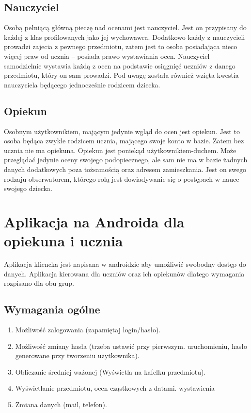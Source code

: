\documentclass[12pt, titlepage]{article}
\begin{document}
\subsection{Nauczyciel}

Osobą pełniącą główną pieczę nad ocenami jest nauczyciel. Jest on przypisany do każdej z klas profilowanych jako jej wychowawca. Dodatkowo każdy z nauczycieli prowadzi zajecia z pewnego przedmiotu, zatem jest to osoba posiadająca nieco więcej praw od ucznia – posiada prawo wystawiania ocen. Nauczyciel samodzielnie wystawia każdą z ocen na podstawie osiągnięć uczniów z danego przedmiotu, który on sam prowadzi. Pod uwagę została również wzięta kwestia nauczyciela będącego jednocześnie rodzicem dziecka.

\subsection{Opiekun}

Osobnym użytkownikiem, mającym jedynie wgląd do ocen jest opiekun. Jest to osoba będąca zwykle rodzicem ucznia, mającego swoje konto w bazie. Zatem bez ucznia nie ma opiekuna. Opiekun jest poniekąd użytkownikiem-duchem. Może przeglądać jedynie oceny swojego podopiecznego, ale sam nie ma w bazie żadnych danych dodatkowych poza tożsamością oraz adresem zamieszkania. Jest on swego rodzaju obserwatorem, którego rolą jest dowiadywanie się o postępach w nauce swojego dziecka. 

\section{Aplikacja na Androida dla opiekuna i ucznia}

Aplikacja kliencka jest napisana w androidzie aby umożliwić swobodny dostęp do danych. Aplikacja kierowana dla uczniów oraz ich opiekunów dlatego wymagania rozpisano dla obu grup.

\subsection{Wymagania ogólne}

\begin{enumerate}
 \item Możliwość zalogowania (zapamiętaj login/hasło).
 \item Możliwość zmiany hasła (trzeba ustawić przy pierwszym. uruchomieniu, hasło generowane przy tworzeniu użytkownika).
 \item Obliczanie średniej ważonej (Wyświetla na kafelku przedmiotu).
 \item Wyświetlanie przedmiotu, ocen cząstkowych z datami. wystawienia
 \item Zmiana danych (mail, telefon).
\end{enumerate}
\end{document}
